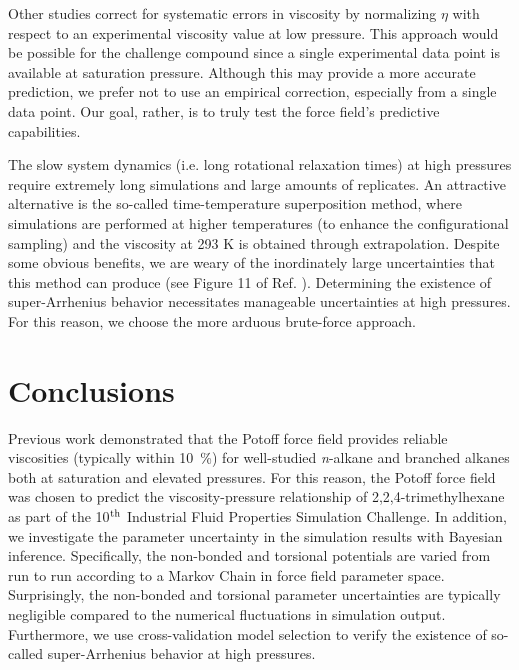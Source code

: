 \documentclass[preprint,review,12pt]{elsarticle}
\begin{document}
	
	Other studies \cite{Liu2015} correct for systematic errors in viscosity by normalizing $\eta$ with respect to an experimental viscosity value at low pressure. This approach would be possible for the challenge compound since a single experimental data point is available at saturation pressure. Although this may provide a more accurate prediction, we prefer not to use an empirical correction, especially from a single data point. Our goal, rather, is to truly test the force field's predictive capabilities.
	
	The slow system dynamics (i.e. long rotational relaxation times) at high pressures require extremely long simulations and large amounts of replicates. An attractive alternative is the so-called time-temperature superposition method, where simulations are performed at higher temperatures (to enhance the configurational sampling) and the viscosity at 293 K is obtained through extrapolation. Despite some obvious benefits, we are weary of the inordinately large uncertainties that this method can produce (see Figure 11 of Ref. ). Determining the existence of super-Arrhenius behavior necessitates manageable uncertainties at high pressures. For this reason, we choose the more arduous brute-force approach.	

	
%	
	
	\section{Conclusions} \label{Conclusions}
	
    Previous work demonstrated that the Potoff force field provides reliable viscosities (typically within 10~\%) for well-studied \textit{n}-alkane and branched alkanes both at saturation and elevated pressures. For this reason, the Potoff force field was chosen to predict the viscosity-pressure relationship of 2,2,4-trimethylhexane as part of the 10$^{\rm th}$ Industrial Fluid Properties Simulation Challenge. In addition, we investigate the parameter uncertainty in the simulation results with Bayesian inference. Specifically, the non-bonded and torsional potentials are varied from run to run according to a Markov Chain in force field parameter space. Surprisingly, the non-bonded and torsional parameter uncertainties are typically negligible compared to the numerical fluctuations in simulation output. Furthermore, we use cross-validation model selection to verify the existence of so-called super-Arrhenius behavior at high pressures.
	
\end{document}
